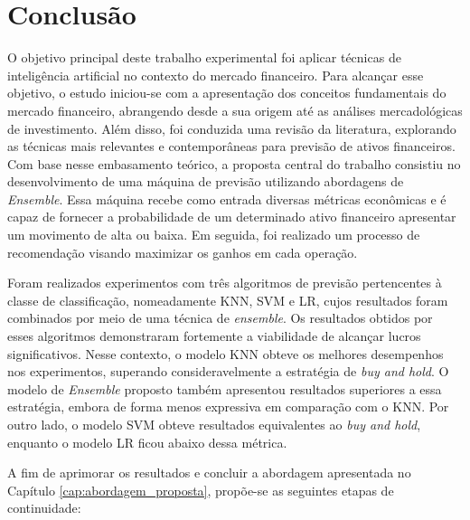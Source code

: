 \chapter{Conclusão}
\label{cap:conclusao}
O objetivo principal deste trabalho experimental foi aplicar técnicas de inteligência artificial no contexto do mercado financeiro. Para alcançar esse objetivo, o estudo iniciou-se com a apresentação dos conceitos fundamentais do mercado financeiro, abrangendo desde a sua origem até as análises mercadológicas de investimento. Além disso, foi conduzida uma revisão da literatura, explorando as técnicas mais relevantes e contemporâneas para previsão de ativos financeiros.
Com base nesse embasamento teórico, a proposta central do trabalho consistiu no desenvolvimento de uma máquina de previsão utilizando abordagens de \textit{Ensemble}. Essa máquina recebe como entrada diversas métricas econômicas e é capaz de fornecer a probabilidade de um determinado ativo financeiro apresentar um movimento de alta ou baixa. Em seguida, foi realizado um processo de recomendação visando maximizar os ganhos em cada operação.

Foram realizados experimentos com três algoritmos de previsão pertencentes à classe de classificação, nomeadamente \ac{KNN}, \ac{SVM} e \ac{LR}, cujos resultados foram combinados por meio de uma técnica de \textit{ensemble}. Os resultados obtidos por esses algoritmos demonstraram fortemente a viabilidade de alcançar lucros significativos. Nesse contexto, o modelo \ac{KNN} obteve os melhores desempenhos nos experimentos, superando consideravelmente a estratégia de \textit{buy and hold}. O modelo de \textit{Ensemble} proposto também apresentou resultados superiores a essa estratégia, embora de forma menos expressiva em comparação com o \ac{KNN}. Por outro lado, o modelo \ac{SVM} obteve resultados equivalentes ao \textit{buy and hold}, enquanto o modelo LR ficou abaixo dessa métrica.

A fim de aprimorar os resultados e concluir a abordagem apresentada no Capítulo \ref{cap:abordagem_proposta}, propõe-se as seguintes etapas de continuidade:

